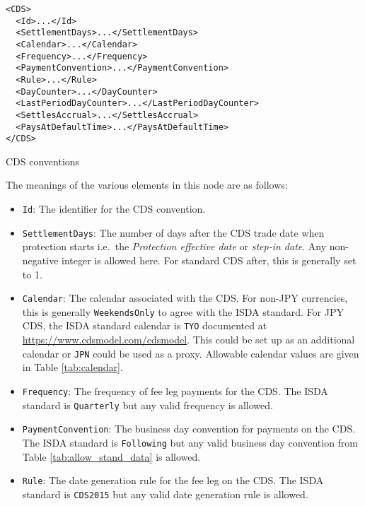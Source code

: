 \begin{listing}[H]
\begin{verbatim}
<CDS>
  <Id>...</Id>
  <SettlementDays>...</SettlementDays>
  <Calendar>...</Calendar>
  <Frequency>...</Frequency>
  <PaymentConvention>...</PaymentConvention>
  <Rule>...</Rule>
  <DayCounter>...</DayCounter>
  <LastPeriodDayCounter>...</LastPeriodDayCounter>
  <SettlesAccrual>...</SettlesAccrual>
  <PaysAtDefaultTime>...</PaysAtDefaultTime>
</CDS>
\end{verbatim}
\caption{CDS conventions}
\label{lst:cds_conventions}
\end{listing}

The meanings of the various elements in this node are as follows:
\begin{itemize}

\item \lstinline!Id!:
The identifier for the CDS convention.

\item \lstinline!SettlementDays!:
The number of days after the CDS trade date when protection starts i.e.\ the \textit{Protection effective date} or \textit{step-in date}. Any non-negative integer is allowed here. For standard CDS after, this is generally set to 1.

\item \lstinline!Calendar!:
The calendar associated with the CDS. For non-JPY currencies, this is generally \lstinline!WeekendsOnly! to agree with the ISDA standard. For JPY CDS, the ISDA standard calendar is \lstinline!TYO! documented at \url{https://www.cdsmodel.com/cdsmodel}. This could be set up as an additional calendar or \lstinline!JPN! could be used as a proxy. Allowable calendar values are given in Table \ref{tab:calendar}.

\item \lstinline!Frequency!:
The frequency of fee leg payments for the CDS. The ISDA standard is \lstinline!Quarterly! but any valid frequency is allowed.

\item \lstinline!PaymentConvention!:
The business day convention for payments on the CDS. The ISDA standard is \lstinline!Following! but any valid business day convention from Table \ref{tab:allow_stand_data} is allowed.

\item \lstinline!Rule!:
The date generation rule for the fee leg on the CDS. The ISDA standard is \lstinline!CDS2015! but any valid date generation rule is allowed.


\end{itemize}
